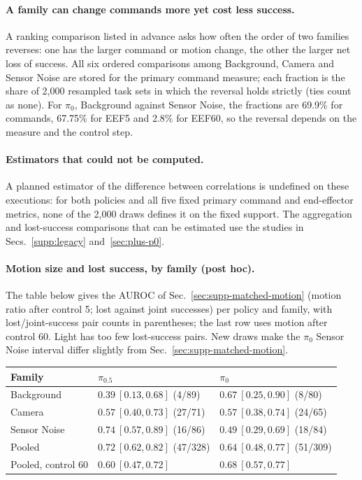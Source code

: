 \paragraph{A family can change commands more yet cost less success.}
A ranking comparison listed in advance asks how often the order of two families reverses: one has the larger command or motion change, the other the larger net loss of success. All six ordered comparisons among Background, Camera and Sensor Noise are stored for the primary command measure; each fraction is the share of 2,000 resampled task sets in which the reversal holds strictly (ties count as none). For $\pi_0$, Background against Sensor Noise, the fractions are 69.9\% for commands, 67.75\% for EEF5 and 2.8\% for EEF60, so the reversal depends on the measure and the control step.

\paragraph{Estimators that could not be computed.}
A planned estimator of the difference between correlations is undefined on these executions: for both policies and all five fixed primary command and end-effector metrics, none of the 2,000 draws defines it on the fixed support. The aggregation and lost-success comparisons that can be estimated use the studies in Secs.~\ref{supp:legacy} and~\ref{sec:plus-p0}.

\paragraph{Motion size and lost success, by family (post hoc).}
The table below gives the AUROC of Sec.~\ref{sec:supp-matched-motion} (motion ratio after control 5; lost against joint successes) per policy and family, with lost/joint-success pair counts in parentheses; the last row uses motion after control 60. Light has too few lost-success pairs. New draws make the $\pi_0$ Sensor Noise interval differ slightly from Sec.~\ref{sec:supp-matched-motion}.

\begin{center}
\scriptsize
\setlength{\tabcolsep}{3pt}
\begin{tabular}{@{}lll@{}}
\toprule
Family & $\pi_{0.5}$ & $\pi_0$\\
\midrule
Background & $0.39\ [0.13,0.68]$ (4/89) & $0.67\ [0.25,0.90]$ (8/80)\\
Camera & $0.57\ [0.40,0.73]$ (27/71) & $0.57\ [0.38,0.74]$ (24/65)\\
Sensor Noise & $0.74\ [0.57,0.89]$ (16/86) & $0.49\ [0.29,0.69]$ (18/84)\\
Pooled & $0.72\ [0.62,0.82]$ (47/328) & $0.64\ [0.48,0.77]$ (51/309)\\
Pooled, control 60 & $0.60\ [0.47,0.72]$ & $0.68\ [0.57,0.77]$\\
\bottomrule
\end{tabular}
\end{center}

